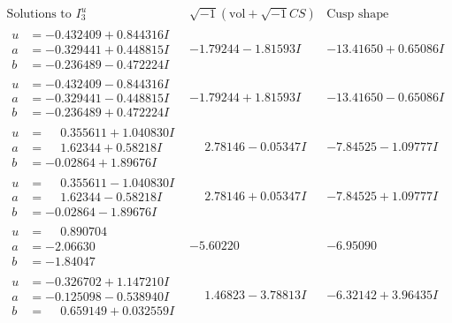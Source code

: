 \documentclass[1p]{elsarticle_modified}
\theoremstyle{definition}
\newcommand{\I}{\sqrt{-1}}
\begin{document}
$$\begin{array}{c|c|c}  
\text{Solutions to }I^u_{3}& \I (\text{vol} + \sqrt{-1}CS) & \text{Cusp shape}\\
 \hline 
\begin{aligned}
u &= -0.432409 + 0.844316 I \\
a &= -0.329441 + 0.448815 I \\
b &= -0.236489 - 0.472224 I\end{aligned}
 & -1.79244 - 1.81593 I & -13.41650 + 0.65086 I \\ \hline\begin{aligned}
u &= -0.432409 - 0.844316 I \\
a &= -0.329441 - 0.448815 I \\
b &= -0.236489 + 0.472224 I\end{aligned}
 & -1.79244 + 1.81593 I & -13.41650 - 0.65086 I \\ \hline\begin{aligned}
u &= \phantom{-}0.355611 + 1.040830 I \\
a &= \phantom{-}1.62344 + 0.58218 I \\
b &= -0.02864 + 1.89676 I\end{aligned}
 & \phantom{-}2.78146 - 0.05347 I & -7.84525 - 1.09777 I \\ \hline\begin{aligned}
u &= \phantom{-}0.355611 - 1.040830 I \\
a &= \phantom{-}1.62344 - 0.58218 I \\
b &= -0.02864 - 1.89676 I\end{aligned}
 & \phantom{-}2.78146 + 0.05347 I & -7.84525 + 1.09777 I \\ \hline\begin{aligned}
u &= \phantom{-}0.890704\phantom{ +0.000000I} \\
a &= -2.06630\phantom{ +0.000000I} \\
b &= -1.84047\phantom{ +0.000000I}\end{aligned}
 & -5.60220\phantom{ +0.000000I} & -6.95090\phantom{ +0.000000I} \\ \hline\begin{aligned}
u &= -0.326702 + 1.147210 I \\
a &= -0.125098 - 0.538940 I \\
b &= \phantom{-}0.659149 + 0.032559 I\end{aligned}
 & \phantom{-}1.46823 - 3.78813 I & -6.32142 + 3.96435 I \\ \hline\begin{aligned}

\end{aligned}
\end{array}$$
\end{document}
